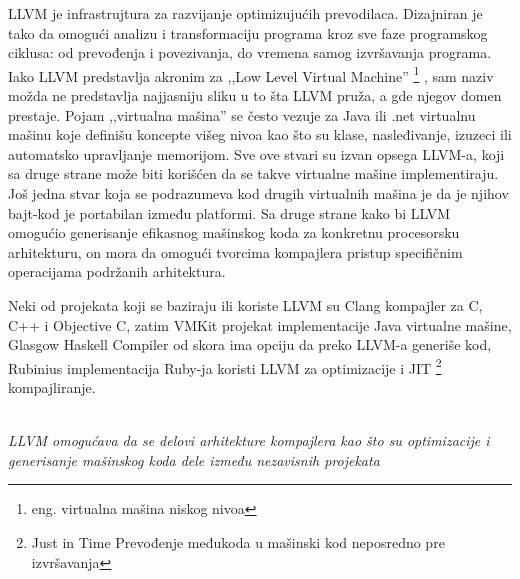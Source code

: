 LLVM je infrastrujtura za razvijanje optimizujućih prevodilaca. Dizajniran je tako da omogući analizu i transformaciju programa kroz sve faze programskog ciklusa: od prevođenja i povezivanja, do vremena samog izvršavanja programa\cite{llvm-cgo04}. 
Iako LLVM predstavlja akronim za ,,Low Level Virtual Machine''
\footnote{eng. virtualna mašina niskog nivoa}
, sam naziv možda ne predstavlja najjasniju sliku u to šta LLVM pruža, a gde njegov domen prestaje. 
Pojam ,,virtualna mašina'' se često vezuje za Java ili .net virtualnu mašinu koje definišu koncepte višeg nivoa kao što su klase, nasleđivanje, izuzeci ili automatsko upravljanje memorijom. 
Sve ove stvari su izvan opsega LLVM-a, koji sa druge strane može biti korišćen da se takve virtualne mašine implementiraju. 
Još jedna stvar koja se podrazumeva kod drugih virtualnih mašina je da je njihov bajt-kod je portabilan između platformi. 
Sa druge strane kako bi LLVM omogućio generisanje efikasnog mašinskog koda za konkretnu procesorsku arhitekturu, on mora da omogući tvorcima kompajlera pristup specifičnim operacijama podržanih arhitektura. 

Neki od projekata koji se baziraju ili koriste LLVM su Clang \ndash kompajler za C, C++ i Objective C, 
zatim VMKit projekat implementacije Java virtualne mašine, 
Glasgow Haskell Compiler od skora ima opciju da preko LLVM-a generiše kod, 
Rubinius implementacija Ruby-ja koristi LLVM za optimizacije i JIT
\footnote{\skr \eng Just in Time \ndash Prevođenje međukoda u mašinski kod neposredno pre izvršavanja} 
kompajliranje.

\begin{center}

 \\

\textit{LLVM omogućava da se delovi arhitekture kompajlera kao što su optimizacije i generisanje mašinskog koda dele između nezavisnih projekata}
\end{center}

